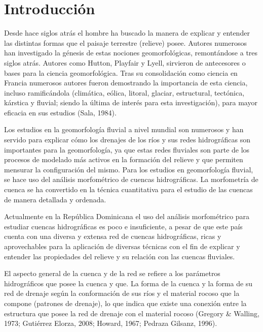 \documentclass[11pt,]{article}
\begin{document}
\vskip 6.5pt


\noindent  \section{Introducción}\label{introducciuxf3n}

Desde hace siglos atrás el hombre ha buscado la manera de explicar y
entender las distintas formas que el paisaje terrestre (relieve) posee.
Autores numerosos han investigado la génesis de estas nociones
geomorfológicas, remontándose a tres siglos atrás. Autores como Hutton,
Playfair y Lyell, sirvieron de antecesores o bases para la ciencia
geomorfológica. Tras su consolidación como ciencia en Francia numerosos
autores fueron demostrando la importancia de esta ciencia, incluso
ramificándola (climática, eólica, litoral, glaciar, estructural,
tectónica, kárstica y fluvial; siendo la última de interés para esta
investigación), para mayor eficacia en sus estudios (Sala, 1984).

Los estudios en la geomorfología fluvial a nivel mundial son numerosos y
han servido para explicar cómo los drenajes de los ríos y sus redes
hidrográficas son importantes para la geomorfología, ya que estas redes
fluviales son parte de los procesos de modelado más activos en la
formación del relieve y que permiten mensurar la configuración del
mismo. Para los estudios en geomorfología fluvial, se hace uso del
análisis morfométrico de cuencas hidrográficas. La morfometría de cuenca
se ha convertido en la técnica cuantitativa para el estudio de las
cuencas de manera detallada y ordenada.

Actualmente en la República Dominicana el uso del análisis morfométrico
para estudiar cuencas hidrográficas es poco e insuficiente, a pesar de
que este país cuenta con una diversa y extensa red de cuencas
hidrográficas, ricas y aprovechables para la aplicación de diversas
técnicas con el fin de explicar y entender las propiedades del relieve y
su relación con las cuencas fluviales.

El aspecto general de la cuenca y de la red se refiere a los parámetros
hidrográficos que posee la cuenca y que. La forma de la cuenca y la
forma de su red de drenaje según la conformación de sus ríos y el
material rocoso que la compone (patrones de drenaje), lo que indica que
existe una conexión entre la estructura que posee la red de drenaje con
el material rocoso (Gregory \& Walling, 1973; Gutiérrez Elorza, 2008;
Howard, 1967; Pedraza Gilsanz, 1996).
\end{document}
